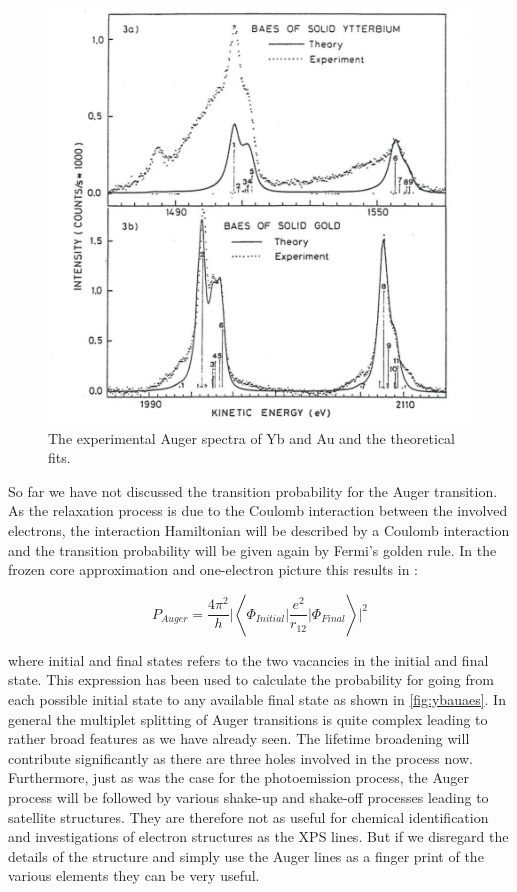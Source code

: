 \begin{figure}[h!]
	\begin{center}
	\includegraphics[scale=4]{figures/06_05.png}
	\caption{The experimental Auger spectra of Yb and Au and the theoretical fits.}
	\label{fig:ybauaes}
	\end{center}
\end{figure}

So far we have not discussed the transition probability for the Auger transition. As the relaxation process is due to the Coulomb interaction between the involved electrons, the interaction Hamiltonian will be described by a Coulomb interaction and the transition probability will be given again by Fermi's golden rule. In the frozen core approximation and one-electron picture this results in \cite{wentzel}:

\begin{equation}
P_{Auger}=\frac{4\pi^2}{h}\vert \left< \Phi_{Initial}\vert \frac{e^2}{r_{12}}\vert \Phi_{Final}\right>\vert ^2
\end{equation}

\noindent where initial and final states refers to the two vacancies in the initial and final state. This expression has been used to calculate the probability for going from each possible initial state to any available final state as shown in \autoref{fig:ybauaes}. In general the multiplet splitting of Auger transitions is quite complex leading to rather broad features as we have already seen. The lifetime broadening will contribute significantly as there are three holes involved in the process now. Furthermore, just as was  the case for the photoemission process, the Auger process will be followed by various shake-up and shake-off processes leading to satellite structures. They are therefore not as useful for chemical identification and investigations of electron structures as the XPS lines. But if we disregard the details of the structure and simply use the Auger lines as a finger print of the various elements they can be very useful.


